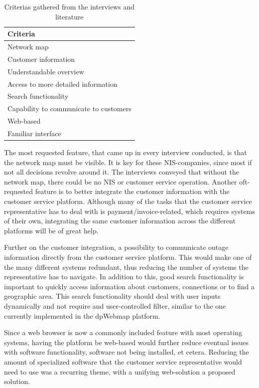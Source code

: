 \documentclass[a4paper,12pt,titlepage]{article}
\begin{document}
\begin{table} [h]
\caption {Criterias gathered from the interviews and literature}
\centering
	\begin{tabular}{|l|}
		\hline
		{\bf Criteria}\\
  		\hline 
	Network map\\
    Customer information\\
    Understandable overview\\
    Access to more detailed information\\
    Search functionality\\
    Capability to communicate to customers\\
    Web-based\\
    Familiar interface\\
	\hline
	\end{tabular}
	\label{tab:criteriaTable}
\end{table}

The most requested feature, that came up in every interview conducted, is that the network map must be visible. It is key for these NIS-companies, since most if not all decisions revolve around it. The interviews conveyed that without the network map, there could be no NIS or customer service operation. Another oft-requested feature is to better integrate the customer information with the customer service platform. Although many of the tasks that the customer service representative has to deal with is payment/invoice-related, which requires systems of their own, integrating the same customer information across the different platforms will be of great help.

Further on the customer integration, a possibility to communicate outage information directly from the customer service platform. This would make one of the many different systems redundant, thus reducing the number of systems the representative has to navigate. In addition to this, good search functionality is important to quickly access information about customers, connections or to find a geographic area. This search functionality should deal with user inputs dynamically and not require and user-controlled filter, similar to the one currently implemented in the dpWebmap platform.

Since a web browser is now a commonly included feature with most operating systems, having the platform be web-based would further reduce eventual issues with software functionality, software not being installed, et cetera. Reducing the amount of specialized software that the customer service representative would need to use was a recurring theme, with a unifying web-solution a proposed solution.
\end{document}
